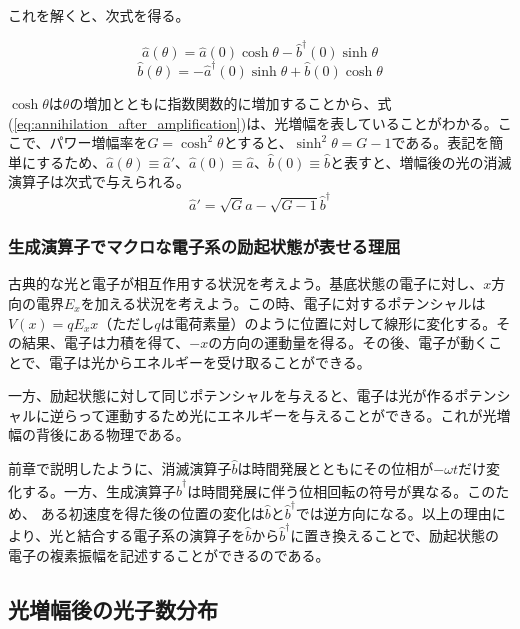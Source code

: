 これを解くと、次式を得る。

\begin{equation}
  \hat a(\theta) = \hat a(0) \cosh \theta - \hat b^\dagger(0)\sinh \theta
  \label{eq:annihilation_after_amplification}
\end{equation}
\begin{equation}
  \hat b(\theta) = -\hat a^\dagger(0) \sinh \theta + \hat b(0)\cosh \theta
\end{equation}

$\cosh \theta$は$\theta$の増加とともに指数関数的に増加することから、式(\ref{eq:annihilation_after_amplification})は、光増幅を表していることがわかる。ここで、パワー増幅率を$G = \cosh^2 \theta$とすると、$\sinh^2 \theta = G - 1$である。表記を簡単にするため、$\hat a(\theta) \equiv \hat a'$、$\hat a(0) \equiv \hat a$、$\hat b(0) \equiv \hat b$と表すと、増幅後の光の消滅演算子は次式で与えられる。
\begin{equation}
  \hat a' = \sqrt G \hat a - \sqrt {G - 1} \hat b^\dagger
\end{equation}


\subsubsection{生成演算子でマクロな電子系の励起状態が表せる理屈}
古典的な光と電子が相互作用する状況を考えよう。基底状態の電子に対し、$x$方向の電界$E_x$を加える状況を考えよう。この時、電子に対するポテンシャルは
$V(x) = qE_x x$（ただし$q$は電荷素量）のように位置に対して線形に変化する。その結果、電子は力積を得て、$-x$の方向の運動量を得る。その後、電子が動くことで、電子は光からエネルギーを受け取ることができる。

一方、励起状態に対して同じポテンシャルを与えると、電子は光が作るポテンシャルに逆らって運動するため光にエネルギーを与えることができる。これが光増幅の背後にある物理である。

前章で説明したように、消滅演算子$\hat b$は時間発展とともにその位相が$-\omega t$だけ変化する。一方、生成演算子$\hat b^\dagger$は時間発展に伴う位相回転の符号が異なる。このため、
ある初速度を得た後の位置の変化は$\hat b$と$\hat b^\dagger$では逆方向になる。以上の理由により、光と結合する電子系の演算子を$\hat b$から$\hat b^\dagger$に置き換えることで、励起状態の電子の複素振幅を記述することができるのである。

\subsection{光増幅後の光子数分布}

